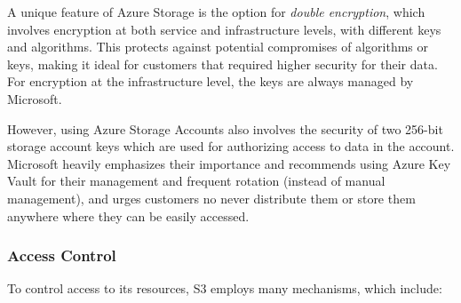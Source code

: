 A unique feature of Azure Storage is the option for \textit{double encryption}, which involves encryption at both service and infrastructure levels, with different keys and algorithms. This protects against potential compromises of algorithms or keys, making it ideal for customers that required higher security for their data. For encryption at the infrastructure level, the keys are always managed by Microsoft.~\cite{blob_at_rest}

However, using Azure Storage Accounts also involves the security of two 256-bit storage account keys which are used for authorizing access to data in the account. Microsoft heavily emphasizes their importance and recommends using Azure Key Vault for their management and frequent rotation (instead of manual management), and urges customers no never distribute them or store them anywhere where they can be easily accessed.~ \cite {blob_account_keys}

\subsubsection{Access Control}
To control access to its resources, S3 employs many mechanisms, which include: ~\cite{s3faq, s3_access,s3_access_guidelines,s3_scp,s3_vpc,s3vsblobsecurity}

